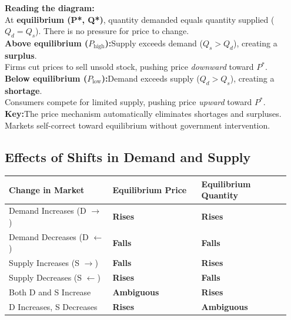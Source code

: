 \documentclass[11pt, a4paper, twoside]{book}
\begin{document}
\begin{diagrambox}
{%
}{%
\textbf{\color{NavyPrimary}Reading the diagram:}\\[4pt]
At \textbf{equilibrium (P*, Q*)}, quantity demanded equals quantity supplied ($Q_d = Q_s$). There is no pressure for price to change.\\[6pt]
\textbf{Above equilibrium ($P_{\text{high}}$):}\enspace Supply exceeds demand ($Q_s > Q_d$), creating a \textbf{surplus}.\\[2pt]
Firms cut prices to sell unsold stock, pushing price \emph{downward} toward $P^*$.\\[6pt]
\textbf{Below equilibrium ($P_{\text{low}}$):}\enspace Demand exceeds supply ($Q_d > Q_s$), creating a \textbf{shortage}.\\[2pt]
Consumers compete for limited supply, pushing price \emph{upward} toward $P^*$.\\[8pt]
\textbf{\color{GoldAccent}Key:}\enspace The price mechanism automatically eliminates shortages and surpluses.\\[2pt]
Markets self-correct toward equilibrium without government intervention.%
}
\end{diagrambox}

\subsection{Effects of Shifts in Demand and Supply}

\begin{tcolorbox}[enhanced,colback=LightBlue,colframe=MidBlue!70,arc=0pt,boxrule=0.8pt]
\begin{tabular}{@{}>{\RaggedRight\arraybackslash}p{0.35\linewidth}>{\RaggedRight\arraybackslash}p{0.3\linewidth}>{\RaggedRight\arraybackslash}p{0.3\linewidth}@{}}
\textbf{\color{NavyPrimary}Change in Market} & \textbf{\color{NavyPrimary}Equilibrium Price} & \textbf{\color{NavyPrimary}Equilibrium Quantity} \\
\midrule
Demand Increases (D $\rightarrow$) & \textbf{Rises} & \textbf{Rises} \\
Demand Decreases (D $\leftarrow$) & \textbf{Falls} & \textbf{Falls} \\
Supply Increases (S $\rightarrow$) & \textbf{Falls} & \textbf{Rises} \\
Supply Decreases (S $\leftarrow$) & \textbf{Rises} & \textbf{Falls} \\
\midrule
Both D and S Increase & \textbf{Ambiguous} & \textbf{Rises} \\
D Increases, S Decreases & \textbf{Rises} & \textbf{Ambiguous} \\
\end{tabular}
\end{tcolorbox}
\end{document}
